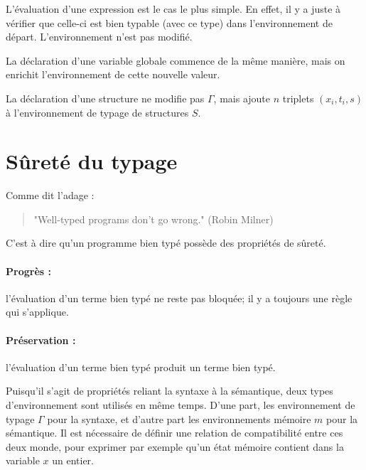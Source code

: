 L'évaluation d'une expression est le cas le plus simple. En effet, il y a juste
à vérifier que celle-ci est bien typable (avec ce type) dans l'environnement de
départ. L'environnement n'est pas modifié.

\begin{mathpar}
\end{mathpar}

La déclaration d'une variable globale commence de la même manière, mais on
enrichit l'environnement de cette nouvelle valeur.

\begin{mathpar}
\end{mathpar}

La déclaration d'une structure ne modifie pas $Γ$, mais ajoute $n$ triplets
$(x_i, t_i, s)$ à l'environnement de typage de structures $S$.

\begin{mathpar}
\end{mathpar}

\section{Sûreté du typage}

Comme dit l'adage :

\begin{quote}
"Well-typed programs don't go wrong." (Robin Milner)
\end{quote}

C'est à dire qu'un programme bien typé possède des propriétés de sûreté.

\paragraph{Progrès :} l'évaluation d'un terme bien typé ne reste pas bloquée;
il y a toujours une règle qui s'applique.

\paragraph{Préservation :} l'évaluation d'un terme bien typé produit un terme
bien typé.

Puisqu'il s'agit de propriétés reliant la syntaxe à la sémantique, deux types
d'environnement sont utilisés en même temps. D'une part, les environnement de
typage $Γ$ pour la syntaxe, et d'autre part les environnements mémoire $m$ pour
la sémantique. Il est nécessaire de définir une relation de compatibilité entre
ces deux monde, pour exprimer par exemple qu'un état mémoire contient dans la
variable $x$ un entier.

